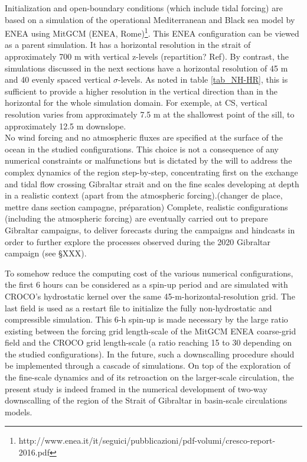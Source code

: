 Initialization and open-boundary conditions (which include tidal forcing) are based on a simulation of the operational Mediterranean and Black sea model by ENEA using MitGCM (ENEA, Rome)\footnote{http://www.enea.it/it/seguici/pubblicazioni/pdf-volumi/cresco-report-2016.pdf}. This ENEA configuration can be viewed as a parent simulation. It has a horizontal resolution in the strait of approximately 700 m with vertical z-levels (repartition? Ref). By contrast, the simulations discussed in the next sections have a horizontal resolution of 45 m and 40 evenly spaced vertical $\sigma$-levels. As noted in table \ref{tab_NH-HR}, this is sufficient to provide a higher resolution in the vertical direction than in the horizontal for the whole simulation domain. For exemple, at CS, vertical resolution varies from approximately 7.5 m at the shallowest point of the sill, to approximately 12.5 m downslope.\\

No wind forcing and no atmospheric fluxes are specified at the surface of the ocean in the studied configurations. This choice is not a consequence of any numerical constraints or malfunctions but is dictated by the will to address the complex dynamics of the region step-by-step, concentrating first on the exchange and tidal flow crossing Gibraltar strait and on the fine scales developing at depth in a realistic context (apart from the atmospheric forcing).\color{red}(changer de place, mettre dans section campagne, préparation) Complete, realistic configurations (including the atmospheric forcing) are eventually carried out to prepare Gibraltar campaigns, to deliver forecasts during the campaigns and hindcasts in order to further explore the processes observed during the 2020 Gibraltar campaign (see \S XXX).\color{black}

To somehow reduce the computing cost of the various numerical configurations, the first 6 hours can be considered as a spin-up period and are simulated with CROCO's hydrostatic kernel over the same 45-m-horizontal-resolution grid. The last field is used as a restart file to initialize the fully non-hydrostatic and compressible simulation. This 6-h spin-up is made necessary by the large ratio existing between the forcing grid length-scale of the MitGCM ENEA coarse-grid field and the CROCO grid length-scale (a ratio reaching 15 to 30 depending on the studied configurations). In the future, such a downscalling procedure should be implemented through a cascade of simulations. On top of the exploration of the fine-scale dynamics and of its retroaction on the larger-scale circulation, the present study is indeed framed in the numerical development of two-way downscalling of the region of the Strait of Gibraltar in basin-scale circulations models.


